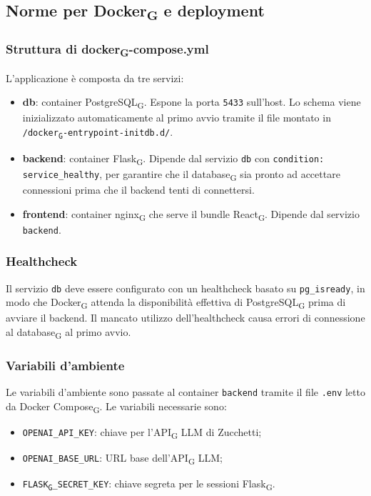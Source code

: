 \documentclass[11pt,a4paper]{article}
\newcommand{\gls}[1]{#1\textsubscript{G}}
\begin{document}
\subsection{Norme per \gls{Docker} e deployment}
 
\subsubsection{Struttura di \gls{docker}-compose.yml}
 
L'applicazione è composta da tre servizi:
\begin{itemize}
    \item \textbf{db}: container \gls{PostgreSQL}. Espone la porta \texttt{5433} sull'host. Lo schema viene inizializzato automaticamente al primo avvio tramite il file montato in \texttt{/\gls{docker}-entrypoint-initdb.d/}.
    \item \textbf{backend}: container \gls{Flask}. Dipende dal servizio \texttt{db} con \texttt{condition: service\_healthy}, per garantire che il \gls{database} sia pronto ad accettare connessioni prima che il backend tenti di connettersi.
    \item \textbf{frontend}: container \gls{nginx} che serve il bundle \gls{React}. Dipende dal servizio \texttt{backend}.
\end{itemize}
 
\subsubsection{Healthcheck}
 
Il servizio \texttt{db} deve essere configurato con un healthcheck basato su \texttt{pg\_isready}, in modo che \gls{Docker} attenda la disponibilità effettiva di \gls{PostgreSQL} prima di avviare il backend. Il mancato utilizzo dell'healthcheck causa errori di connessione al \gls{database} al primo avvio.
 
\subsubsection{Variabili d'ambiente}
 
Le variabili d'ambiente sono passate al container \texttt{backend} tramite il file \texttt{.env} letto da \gls{Docker Compose}. Le variabili necessarie sono:
\begin{itemize}
    \item \texttt{OPENAI\_API\_KEY}: chiave per l'\gls{API} LLM di Zucchetti;
    \item \texttt{OPENAI\_BASE\_URL}: URL base dell'\gls{API} LLM;
    \item \texttt{\gls{FLASK}\_SECRET\_KEY}: chiave segreta per le sessioni \gls{Flask}.
\end{itemize}
 
\end{document}
